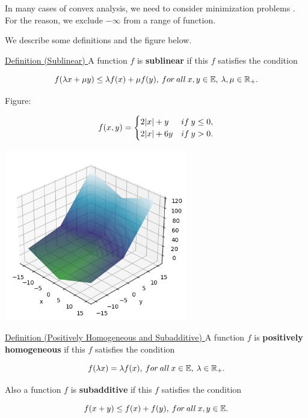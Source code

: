 \documentclass[a4paper,11pt]{jsarticle}
\begin{document}
In many cases of convex analysis, we need to
consider minimization problems . For the reason, we exclude $-\infty$ from a range of function.

We describe some definitions and the figure below.

\begin{itembox}[l]{\underline{Definition (Sublinear) }}
  A function $f$ is \textbf{sublinear} if this $f$ satisfies the condition

  \begin{equation}
    f(\lambda x + \mu y) \leq \lambda f(x) + \mu f(y),\:for \:all\: x, y \in{\mathbb{E}},\: \lambda, \mu \in{\mathbb{R}}_+. \notag
  \end{equation}
\end{itembox}

Figure:

\begin{equation}
  f(x, y)=
  \begin{cases}
    2|x| + y & if\:y \leq 0, \\
    2|x| + 6y & if\:y > 0. \notag
  \end{cases}
\end{equation}

\begin{center}
  \includegraphics[width=8cm]{figures/sublinear_output.png}
\end{center}

\begin{itembox}[l]{\underline{Definition (Positively Homogeneous and Subadditive) }}
  A function $f$ is \textbf{positively homogeneous} if this $f$ satisfies the condition

  \begin{equation}
    f(\lambda x) = \lambda f(x),\:for \:all\: x \in{\mathbb{E}},\: \lambda \in{\mathbb{R}}_+. \notag
  \end{equation}

  Also a function $f$ is \textbf{subadditive} if this $f$ satisfies the condition

  \begin{equation}
    f( x + y) \leq f(x) + f(y),\:for \:all\: x, y \in{\mathbb{E}}. \notag
  \end{equation}
\end{itembox}
\end{document}
